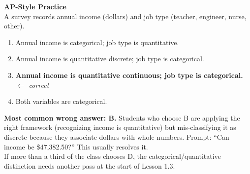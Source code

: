 \documentclass[10pt]{article}
\begin{document}
\vspace{0.16in}

\begin{tcolorbox}[colback=redbg, colframe=redacc, boxrule=0.8pt, arc=2mm,
    left=4mm, right=4mm, top=3mm, bottom=3mm]
\small\textbf{AP-Style Practice}\\[6pt]
A survey records annual income (dollars) and job type (teacher, engineer, nurse, other).

\vspace{10pt}
\begin{enumerate}[label=\textbf{(\Alph*)}, leftmargin=2em, itemsep=6pt]
  \item Annual income is categorical; job type is quantitative.
  \item Annual income is quantitative discrete; job type is categorical.
  \item \textbf{\textcolor{keyred}{Annual income is quantitative continuous; job type is categorical.}}
        \textcolor{keyred}{\textit{$\leftarrow$ correct}}
  \item Both variables are categorical.
\end{enumerate}
\end{tcolorbox}

\vspace{0.1in}
\noindent{} \quad
{}

\vspace{0.12in}
\begin{teachernote}
\textbf{Most common wrong answer: B.} Students who choose B are applying the right framework
(recognizing income is quantitative) but mis-classifying it as discrete because they associate
dollars with whole numbers. Prompt: ``Can income be \$47,382.50?'' This usually resolves it.\\[3pt]
If more than a third of the class chooses D, the categorical/quantitative distinction needs
another pass at the start of Lesson 1.3.
\end{teachernote}
\end{document}
